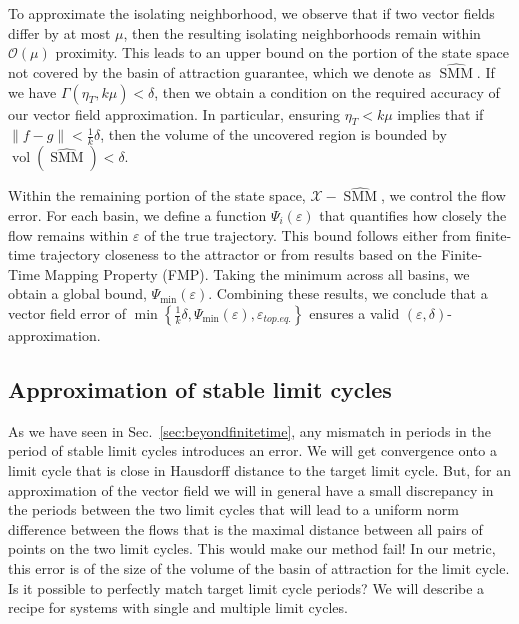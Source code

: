 \documentclass{article}
\newcommand{\vol}{\operatorname{vol}}
\newcounter{ct}
\begin{document}
 To approximate the isolating neighborhood, we observe that if two vector fields differ by at most $\mu$, then the resulting isolating neighborhoods remain within $\mathcal{O}(\mu)$ proximity. This leads to an upper bound on the portion of the state space not covered by the basin of attraction guarantee, which we denote as $\widehat{\operatorname{SMM}}$.
  If we have $\Gamma(\eta_T, k\mu) < \delta$, then we obtain a condition on the required accuracy of our vector field approximation.
 In particular, ensuring $\eta_T < k\mu$ implies that if $\| f - g \| < \tfrac{1}{k} \delta$, then the volume of the uncovered region is bounded by $\vol(\widehat{\operatorname{SMM}}) < \delta$.  

Within the remaining portion of the state space, $\mathcal{X} - \widehat{\operatorname{SMM}}$, we control the flow error.
 For each basin, we define a function $\Psi_i(\varepsilon)$ that quantifies how closely the flow remains within $\varepsilon$ of the true trajectory.
  This bound follows either from finite-time trajectory closeness to the attractor or from results based on the Finite-Time Mapping Property (FMP). Taking the minimum across all basins, we obtain a global bound, $\Psi_{\min}(\varepsilon)$.  
Combining these results, we conclude that  a vector field error of $\min \left\{ \frac{1}{k} \delta, \Psi_{\min}(\varepsilon), \varepsilon_{top.eq.} \right\} $
ensures a valid $(\varepsilon, \delta)$-approximation.





\subsection{Approximation of stable limit cycles}\label{sec:lc_theorem}
As we have seen in Sec.~\ref{sec:beyondfinitetime}, any mismatch in periods in the period of stable limit cycles introduces an error.
We will get convergence onto a limit cycle that is close in Hausdorff distance to the target limit cycle. %
But, for an approximation of the vector field we will in general have a small discrepancy in the periods between the two limit cycles that will lead to a uniform norm difference between the flows that is the maximal distance between all pairs of points on the two limit cycles.
This would make our method fail!
In our metric, this error is of the size of the volume of the basin of attraction for the limit cycle.
Is it possible to perfectly match target limit cycle periods?
We will describe a recipe for systems with single and multiple limit cycles.
\end{document}
